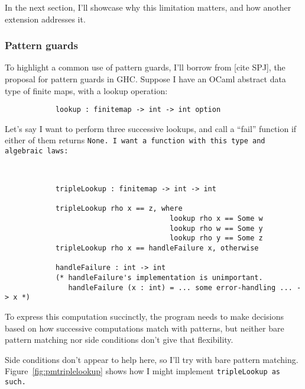 \documentclass[manuscript,screen,review, 12pt, nonacm]{acmart}
\begin{document}
\begin{outline}[enumerate]
    In the next section, I'll showcase why this limitation matters, and how
    another extension addresses it. 

    \subsubsection{Pattern guards}
    \label{guards}

    To highlight a common use of pattern guards, I'll borrow from [cite SPJ],
    the proposal for pattern guards in GHC. Suppose I have an OCaml abstract
    data type of finite maps, with a lookup operation: 

    \begin{minipage}[t]{\textwidth}
        \centering 
        \begin{verbatim}
            lookup : finitemap -> int -> int option
        \end{verbatim}
    \end{minipage}
    
    Let's say I want to perform three successive lookups, and call a “fail”
    function if either of them returns \tt{None}. I want a function with 
    this type and algebraic laws: 

    \begin{minipage}[t]{\textwidth}
        \centering 
        \begin{verbatim}
          

            tripleLookup : finitemap -> int -> int

            tripleLookup rho x == z, where 
                                       lookup rho x == Some w
                                       lookup rho w == Some y
                                       lookup rho y == Some z
            tripleLookup rho x == handleFailure x, otherwise
            
            handleFailure : int -> int 
            (* handleFailure's implementation is unimportant.
               handleFailure (x : int) = ... some error-handling ... -> x *)  

        \end{verbatim}
    \end{minipage}

    To express this computation succinctly, the program needs to make decisions
    based on how successive computations match with patterns, but neither bare
    pattern matching nor side conditions don't give that flexibility. 
    
    Side conditions don't appear to help here, so I'll try with bare pattern
    matching. Figure~\ref{fig:pmtriplelookup} shows how I might implement
    \tt{tripleLookup} as such. 


\end{outline}
\end{document}
